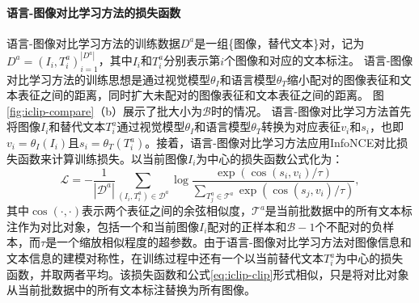 \paragraph{语言-图像对比学习方法的损失函数} 语言-图像对比学习方法的训练数据$D^{a}$是一组\{图像，替代文本\}对，记为$D^{a}={(I_{i}, T_{i}^{a})}_{i=1}^{|D^{a}|}$，其中$I_{i}$和$T^{a}_{i}$分别表示第$i$个图像和对应的文本标注。
语言-图像对比学习方法的训练思想是通过视觉模型$\theta_{I}$和语言模型$\theta_{T}$缩小配对的图像表征和文本表征之间的距离，同时扩大未配对的图像表征和文本表征之间的距离。
图\ref{fig:iclip-compare}（b）展示了批大小为$\mathcal{B}$时的情况。
语言-图像对比学习方法首先将图像$I_{i}$和替代文本$T_{i}^{a}$通过视觉模型$\theta_{I}$和语言模型$\theta_{T}$转换为对应表征$v_{i}$和$s_{i}$，也即$v_{i}=\theta_{I}(I_{i})$且$s_{i}=\theta_{T}(T_{i}^{a})$。接着，语言-图像对比学习方法应用InfoNCE对比损失函数来计算训练损失。以当前图像$I_{i}$为中心的损失函数公式化为：
\begin{equation}
 \mathcal{L}=-\frac{1}{\left|\mathcal{D}^{a}\right|} \sum_{\left(I_{i}, T_{i}^{a}\right) \in \mathcal{D}^{a}} \log \frac{\exp \left(\cos \left(s_{i}, v_{i}\right) / \tau\right)}{\sum_{T_{j}^{a} \in \mathcal{T}^{a}} \exp \left(\cos \left(s_{j}, v_{i}\right) / \tau\right)},
 \label{eq:iclip-clip}
\end{equation}
其中$\cos(\cdot, \cdot)$表示两个表征之间的余弦相似度，$\mathcal{T}^{a}$是当前批数据中的所有文本标注作为对比对象，包括一个和当前图像$I_{i}$配对的正样本和$\mathcal{B}-1$个不配对的负样本，而$\tau$是一个缩放相似程度的超参数。由于语言-图像对比学习方法对图像信息和文本信息的建模对称性，在训练过程中还有一个以当前替代文本$T_{i}^{a}$为中心的损失函数，并取两者平均。该损失函数和公式\eqref{eq:iclip-clip}形式相似，只是将对比对象从当前批数据中的所有文本标注替换为所有图像。
 
